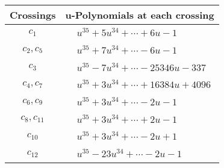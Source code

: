 \documentclass[1p]{elsarticle_modified}
\theoremstyle{definition}
\begin{document}
\begin{tabular}{m{50pt}|m{274pt}}
Crossings & \hspace{64pt}u-Polynomials at each crossing \\
\hline $$\begin{aligned}c_{1}\end{aligned}$$&$\begin{aligned}
&u^{35}+5 u^{34}+\cdots+6 u-1
\end{aligned}$\\
\hline $$\begin{aligned}c_{2},c_{5}\end{aligned}$$&$\begin{aligned}
&u^{35}+7 u^{34}+\cdots-6 u-1
\end{aligned}$\\
\hline $$\begin{aligned}c_{3}\end{aligned}$$&$\begin{aligned}
&u^{35}-7 u^{34}+\cdots-25346 u-337
\end{aligned}$\\
\hline $$\begin{aligned}c_{4},c_{7}\end{aligned}$$&$\begin{aligned}
&u^{35}+3 u^{34}+\cdots+16384 u+4096
\end{aligned}$\\
\hline $$\begin{aligned}c_{6},c_{9}\end{aligned}$$&$\begin{aligned}
&u^{35}+3 u^{34}+\cdots-2 u-1
\end{aligned}$\\
\hline $$\begin{aligned}c_{8},c_{11}\end{aligned}$$&$\begin{aligned}
&u^{35}+3 u^{34}+\cdots+2 u-1
\end{aligned}$\\
\hline $$\begin{aligned}c_{10}\end{aligned}$$&$\begin{aligned}
&u^{35}+3 u^{34}+\cdots-2 u+1
\end{aligned}$\\
\hline $$\begin{aligned}c_{12}\end{aligned}$$&$\begin{aligned}
&u^{35}-23 u^{34}+\cdots-2 u-1
\end{aligned}$\\
\hline
\end{tabular}\\~\\
\end{document}

